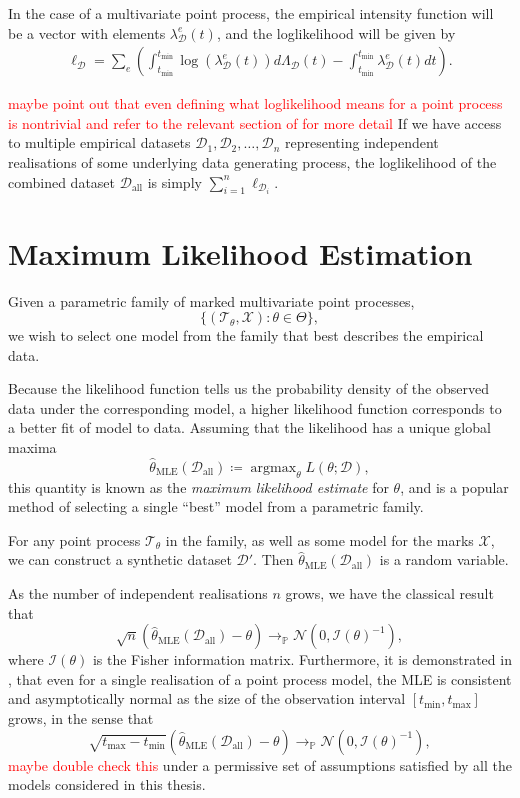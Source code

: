\documentclass[honours,12pt]{unswthesis}
\DeclareMathOperator*{\argmax}{argmax}
\numberwithin{equation}{section}
\begin{document}
In the case of a multivariate point process, the empirical intensity function will be a vector with elements $\lambda_\mathcal{D}^e(t)$, and the loglikelihood will be given by
\begin{equation}
	\begin{align}
		\ell_\mathcal{D} = \sum_e \left(\int_{t_\mathrm{min}}^{t_\mathrm{min}} \log\left(\lambda_\mathcal{D}^e(t)\right)d\Lambda_\mathcal{D}(t) - \int_{t_\mathrm{min}}^{t_\mathrm{min}} \lambda_\mathcal{D}^e(t)dt\right).
	\end{align}
\end{equation}


\textcolor{red}{maybe point out that even defining what loglikelihood means for a point process is nontrivial and refer to the relevant section of \cite{DaleyVereJones} for more detail}
If we have access to multiple empirical datasets $\mathcal{D}_1,\mathcal{D}_2,\ldots,\mathcal{D}_n$ representing independent realisations of some underlying data generating process, the loglikelihood of the combined dataset $\mathcal{D}_\mathrm{all}$ is simply $\sum_{i=1}^n \ell_{\mathcal{D}_i}$.

\section{Maximum Likelihood Estimation}
Given a parametric family of marked multivariate point processes,
$$\{(\mathcal{T}_\theta,\mathcal{X}) : \theta\in\Theta\},$$
we wish to select one model from the family that best describes the empirical data.

Because the likelihood function tells us the probability density of the observed data under the corresponding model, a higher likelihood function corresponds to a better fit of model to data. Assuming that the likelihood has a unique global maxima
$$\hat\theta_\mathrm{MLE}(\mathcal{D}_\mathrm{all}) \coloneq \argmax_\theta L(\theta;\mathcal{D}),$$
this quantity is known as the \textit{maximum likelihood estimate} for $\theta$, and is a popular method of selecting a single ``best'' model from a parametric family.

For any point process $\mathcal{T}_\theta$ in the family, as well as some model for the marks $\mathcal{X}$, we can construct a synthetic dataset $\mathcal{D}'$. Then $\hat\theta_\mathrm{MLE}(\mathcal{D}_\mathrm{all})$ is a random variable.

As the number of independent realisations $n$ grows, we have the classical result that
$$\sqrt{n}\left(\hat\theta_\mathrm{MLE}(\mathcal{D}_\mathrm{all})-\theta\right) \to_\mathbb{P} \mathcal{N}(0,\mathcal{I}(\theta)^{-1}),$$
where $\mathcal{I}(\theta)$ is the Fisher information matrix. Furthermore, it is demonstrated in \cite{Ogata1977}, that even for a single realisation of a point process model, the MLE is consistent and asymptotically normal as the size of the observation interval $[t_\mathrm{min},t_\mathrm{max}]$ grows, in the sense that
$$\sqrt{t_\mathrm{max}-t_\mathrm{min}}\left(\hat\theta_\mathrm{MLE}(\mathcal{D}_\mathrm{all})-\theta\right) \to_\mathbb{P} \mathcal{N}(0,\mathcal{I}(\theta)^{-1}),$$
\textcolor{red}{maybe double check this}
under a permissive set of assumptions satisfied by all the models considered in this thesis.
\end{document}
